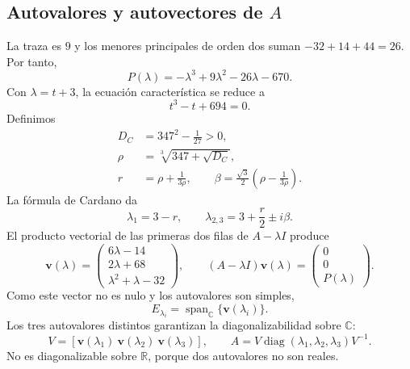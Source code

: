 \documentclass[spanish,letterpaper,oneside]{article}
\begin{document}
\subsection*{Autovalores y autovectores de $A$}
La traza es $9$ y los menores principales de orden dos suman $-32+14+44=26$. Por tanto,
\begin{equation}
P(\lambda)=-\lambda^3+9\lambda^2-26\lambda-670.
\end{equation}
Con $\lambda=t+3$, la ecuación característica se reduce a
\begin{equation}
t^3-t+694=0.
\end{equation}
Definimos
\begin{align}
D_C&=347^2-\frac1{27}>0,\\
\rho&=\sqrt[3]{347+\sqrt{D_C}},\\
r&=\rho+\frac1{3\rho},\qquad
\beta=\frac{\sqrt3}{2}\left(\rho-\frac1{3\rho}\right).
\end{align}
La fórmula de Cardano da
\begin{equation}
\lambda_1=3-r,\qquad\lambda_{2,3}=3+\frac r2\pm i\beta.
\end{equation}
El producto vectorial de las primeras dos filas de $A-\lambda I$ produce
\begin{equation}
\mathbf{v}(\lambda)=\begin{pmatrix}6\lambda-14\\2\lambda+68\\\lambda^2+\lambda-32\end{pmatrix},\qquad
(A-\lambda I)\mathbf{v}(\lambda)=\begin{pmatrix}0\\0\\P(\lambda)\end{pmatrix}.
\end{equation}
Como este vector no es nulo y los autovalores son simples,
\begin{equation}
E_{\lambda_i}=\operatorname{span}_{\mathbb{C}}\{\mathbf{v}(\lambda_i)\}.
\end{equation}
Los tres autovalores distintos garantizan la diagonalizabilidad sobre $\mathbb{C}$:
\begin{equation}
V=[\mathbf{v}(\lambda_1)\ \mathbf{v}(\lambda_2)\ \mathbf{v}(\lambda_3)],\qquad
A=V\operatorname{diag}(\lambda_1,\lambda_2,\lambda_3)V^{-1}.
\end{equation}
No es diagonalizable sobre $\mathbb{R}$, porque dos autovalores no son reales.
\end{document}
